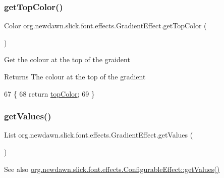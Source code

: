 \subsubsection{\texorpdfstring{get\+Top\+Color()}{getTopColor()}}
{\footnotesize\ttfamily Color org.\+newdawn.\+slick.\+font.\+effects.\+Gradient\+Effect.\+get\+Top\+Color (\begin{DoxyParamCaption}{ }\end{DoxyParamCaption})\hspace{0.3cm}{\ttfamily [inline]}}

Get the colour at the top of the graident

\begin{DoxyReturn}{Returns}
The colour at the top of the gradient 
\end{DoxyReturn}

\begin{DoxyCode}
67                                \{
68         \textcolor{keywordflow}{return} \mbox{\hyperlink{classorg_1_1newdawn_1_1slick_1_1font_1_1effects_1_1_gradient_effect_abd381669fcbe81fae9c0fb7546d8089d}{topColor}};
69     \}
\end{DoxyCode}
\mbox{\label{classorg_1_1newdawn_1_1slick_1_1font_1_1effects_1_1_gradient_effect_a782e65336c5a227dabe24d53e2d8db54}} 
\subsubsection{\texorpdfstring{get\+Values()}{getValues()}}
{\footnotesize\ttfamily List org.\+newdawn.\+slick.\+font.\+effects.\+Gradient\+Effect.\+get\+Values (\begin{DoxyParamCaption}{ }\end{DoxyParamCaption})\hspace{0.3cm}{\ttfamily [inline]}}

\begin{DoxySeeAlso}{See also}
\mbox{\hyperlink{interfaceorg_1_1newdawn_1_1slick_1_1font_1_1effects_1_1_configurable_effect_ac4ea8fedf0f9d7ca7ffe1bd5543d78cb}{org.\+newdawn.\+slick.\+font.\+effects.\+Configurable\+Effect\+::get\+Values()}} 
\end{DoxySeeAlso}


